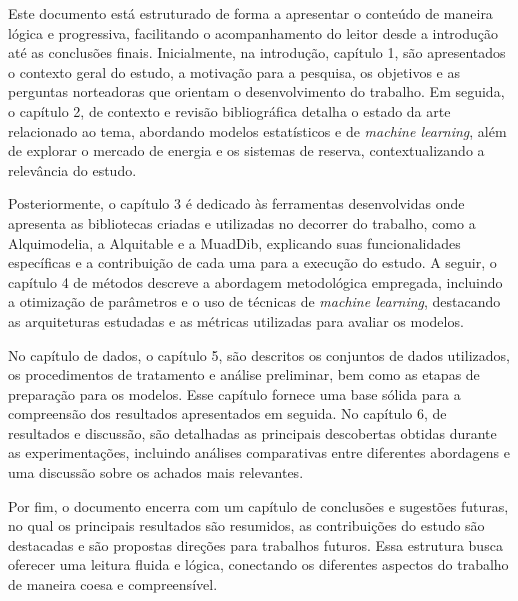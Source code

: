 Este documento está estruturado de forma a apresentar o conteúdo de maneira lógica e progressiva, facilitando o acompanhamento do leitor desde a introdução até as conclusões finais. Inicialmente, na introdução, capítulo 1, são apresentados o contexto geral do estudo, a motivação para a pesquisa, os objetivos e as perguntas norteadoras que orientam o desenvolvimento do trabalho. Em seguida, o capítulo 2, de contexto e revisão bibliográfica detalha o estado da arte relacionado ao tema, abordando modelos estatísticos e de \textit{machine learning}, além de explorar o mercado de energia e os sistemas de reserva, contextualizando a relevância do estudo.\par
Posteriormente, o capítulo 3 é dedicado às ferramentas desenvolvidas onde apresenta as bibliotecas criadas e utilizadas no decorrer do trabalho, como a Alquimodelia, a Alquitable e a MuadDib, explicando suas funcionalidades específicas e a contribuição de cada uma para a execução do estudo. A seguir, o capítulo 4 de métodos descreve a abordagem metodológica empregada, incluindo a otimização de parâmetros e o uso de técnicas de \textit{machine learning}, destacando as arquiteturas estudadas e as métricas utilizadas para avaliar os modelos.\par
No capítulo de dados, o capítulo 5, são descritos os conjuntos de dados utilizados, os procedimentos de tratamento e análise preliminar, bem como as etapas de preparação para os modelos. Esse capítulo fornece uma base sólida para a compreensão dos resultados apresentados em seguida. No capítulo 6, de resultados e discussão, são detalhadas as principais descobertas obtidas durante as experimentações, incluindo análises comparativas entre diferentes abordagens e uma discussão sobre os achados mais relevantes.\par
Por fim, o documento encerra com um capítulo de conclusões e sugestões futuras, no qual os principais resultados são resumidos, as contribuições do estudo são destacadas e são propostas direções para trabalhos futuros. Essa estrutura busca oferecer uma leitura fluida e lógica, conectando os diferentes aspectos do trabalho de maneira coesa e compreensível.\par